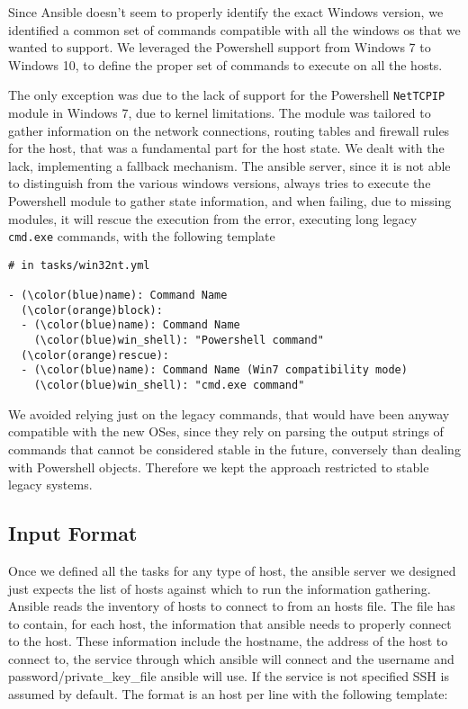 \documentclass[11pt]{article}
\begin{document}
Since Ansible doesn't seem to properly identify the exact Windows version, we identified a common set of commands compatible with all the windows os that we wanted to support. We leveraged the Powershell support from Windows 7 to Windows 10, to define the proper set of commands to execute on all the hosts. 

The only exception was due to the lack of support for the Powershell {\tt NetTCPIP} module in Windows 7, due to kernel limitations. The module was tailored to gather information on the network connections, routing tables and firewall rules for the host, that was a fundamental part for the host state. We dealt with the lack, implementing a fallback mechanism. The ansible server, since it is not able to distinguish from the various windows versions, always tries to execute the Powershell module to gather state information, and when failing, due to missing modules, it will rescue the execution from the error, executing long legacy {\tt cmd.exe} commands, with the following template

\begin{Verbatim}[commandchars=\\\(\)]
# in tasks/win32nt.yml

- (\color(blue)name): Command Name
  (\color(orange)block):
  - (\color(blue)name): Command Name
    (\color(blue)win_shell): "Powershell command"
  (\color(orange)rescue):
  - (\color(blue)name): Command Name (Win7 compatibility mode)
    (\color(blue)win_shell): "cmd.exe command"
\end{Verbatim}

We avoided relying just on the legacy commands, that would have been anyway compatible with the new OSes, since they rely on parsing the output strings of commands that cannot be considered stable in the future, conversely than dealing with Powershell objects. Therefore we kept the approach restricted to stable legacy systems.

\subsection{Input Format}

Once we defined all the tasks for any type of host, the ansible server we designed just expects the list of hosts against which to run the information gathering. Ansible reads the inventory of hosts to connect to from an hosts file. The file has to contain, for each host, the information that ansible needs to properly connect to the host. These information include the hostname, the address of the host to connect to, the service through which ansible will connect and the username and password/private\_key\_file ansible will use. If the service is not specified SSH is assumed by default. The format is an host per line with the following template:
\end{document}
